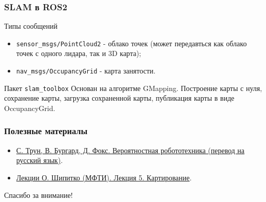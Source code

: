 \documentclass[aspectratio=169,xcolor=dvipsnames]{beamer}
\newcommand{\cmd}[1]{\textcolor{HSEblue}{\texttt{#1}}}
\begin{document}
\begin{frame}
	\frametitle{SLAM в ROS2}
	\begin{block}{Типы сообщений}
		\begin{itemize}
			\item \cmd{sensor\_msgs/PointCloud2} - облако точек (может передавться как облако точек с одного лидара, так и 3D карта);
			\item \cmd{nav\_msgs/OccupancyGrid} - карта занятости.
		\end{itemize}
	\end{block}
	
	\begin{block}{Пакет \cmd{slam\_toolbox}}
		Основан на алгоритме GMapping. Построение карты с нуля, сохранение карты, загрузка сохраненной карты, публикация карты в виде OccupancyGrid.
	\end{block}
\end{frame}

\begin{frame}
	\frametitle{Полезные материалы}
	\small
	\begin{itemize}
		
		\item  
		\href{https://github.com/literator1996/veroyatnostnaya_robototehnica/tree/master}{С. Трун, В. Бургард, Д. Фокс. Вероятностная робототехника (перевод на русский язык)}.
		\item\href{https://github.com/oleg-Shipitko/mipt\_wheeled\_robots\_modeling\_2022/blob/main/slides/Lecture\%205.\%20Mapping.pdf}{Лекции О. Шипитко (МФТИ). Лекция 5. Картирование}.  
	\end{itemize}
\end{frame}

\begin{frame}
	\begin{center}
		\Large Спасибо за внимание!
	\end{center}
	\vfill
\end{frame}
\end{document}
